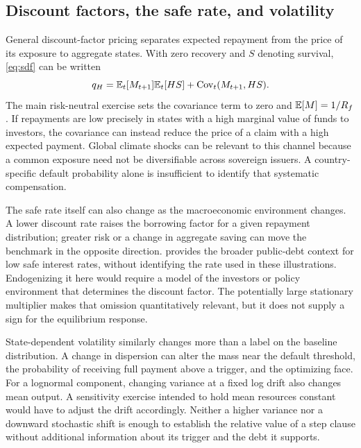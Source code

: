 \subsection{Discount factors, the safe rate, and volatility}\label{app:discounting}
General discount-factor pricing separates expected repayment from the price of its exposure to aggregate states. With zero recovery and $S$ denoting survival, \eqref{eq:sdf} can be written
\begin{equation}\label{eq:sdf_covariance}
 q_H=\mathbb E_t[M_{t+1}]\mathbb E_t[H S]
       +\operatorname{Cov}_t(M_{t+1},H S).
\end{equation}
The main risk-neutral exercise sets the covariance term to zero and $\mathbb E[M]=1/R_f$. If repayments are low precisely in states with a high marginal value of funds to investors, the covariance can instead reduce the price of a claim with a high expected payment. Global climate shocks can be relevant to this channel because a common exposure need not be diversifiable across sovereign issuers. A country-specific default probability alone is insufficient to identify that systematic compensation.

The safe rate itself can also change as the macroeconomic environment changes. A lower discount rate raises the borrowing factor for a given repayment distribution; greater risk or a change in aggregate saving can move the benchmark in the opposite direction. \textcite{Blanchard2019} provides the broader public-debt context for low safe interest rates, without identifying the rate used in these illustrations. Endogenizing it here would require a model of the investors or policy environment that determines the discount factor. The potentially large stationary multiplier makes that omission quantitatively relevant, but it does not supply a sign for the equilibrium response.

State-dependent volatility similarly changes more than a label on the baseline distribution. A change in dispersion can alter the mass near the default threshold, the probability of receiving full payment above a trigger, and the optimizing face. For a lognormal component, changing variance at a fixed log drift also changes mean output. A sensitivity exercise intended to hold mean resources constant would have to adjust the drift accordingly. Neither a higher variance nor a downward stochastic shift is enough to establish the relative value of a step clause without additional information about its trigger and the debt it supports.

